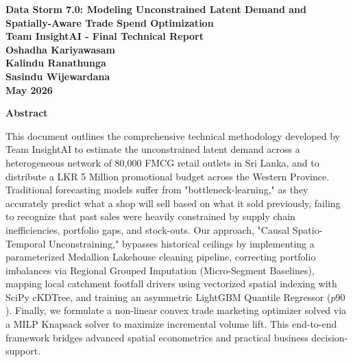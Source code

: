\documentclass[10pt,a4paper]{article}
\begin{document}
\begin{titlepage}
    \centering
    \vspace*{1.5in}
    {\Huge \textbf{Data Storm 7.0: Modeling Unconstrained Latent Demand and Spatially-Aware Trade Spend Optimization}} \\
    \vspace{0.8in}
    {\Large \textbf{Team InsightAI - Final Technical Report}} \\
    \vspace{0.6in}
    {\large \textbf{Oshadha Kariyawasam}} \\
    \vspace{0.15in}
    {\large \textbf{Kalindu Ranathunga}} \\
    \vspace{0.15in}
    {\large \textbf{Sasindu Wijewardana}} \\
    \vspace{1.2in}
    \textbf{May 2026} \\
\end{titlepage}

\begin{center}
    \textbf{Abstract}
\end{center}
\noindent This document outlines the comprehensive technical methodology developed by Team InsightAI to estimate the unconstrained latent demand across a heterogeneous network of 80,000 FMCG retail outlets in Sri Lanka, and to distribute a LKR 5 Million promotional budget across the Western Province. Traditional forecasting models suffer from "bottleneck-learning," as they accurately predict what a shop will sell based on what it sold previously, failing to recognize that past sales were heavily constrained by supply chain inefficiencies, portfolio gaps, and stock-outs. Our approach, "Causal Spatio-Temporal Unconstraining," bypasses historical ceilings by implementing a parameterized Medallion Lakehouse cleaning pipeline, correcting portfolio imbalances via Regional Grouped Imputation (Micro-Segment Baselines), mapping local catchment footfall drivers using vectorized spatial indexing with SciPy cKDTree, and training an asymmetric LightGBM Quantile Regressor ($p90$). Finally, we formulate a non-linear convex trade marketing optimizer solved via a MILP Knapsack solver to maximize incremental volume lift. This end-to-end framework bridges advanced spatial econometrics and practical business decision-support.

\vspace{0.2in}
\end{document}

